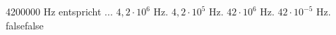     {4200000 Hz entspricht ...}
    {$4,2\cdot 10^6$ Hz.}
    {$4,2\cdot 10^5$ Hz.}
    {$42\cdot 10^6$ Hz.}
    {$42\cdot 10^{-5}$ Hz.}
    {false}{false}
